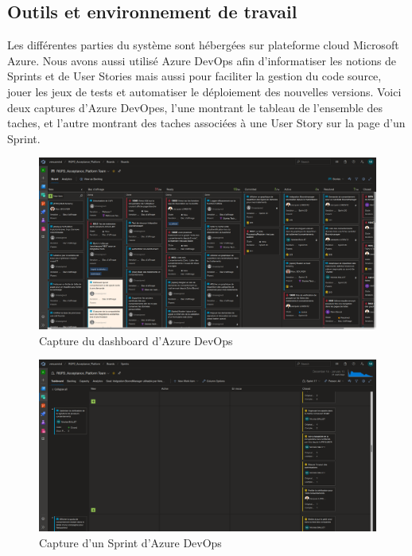 \documentclass[12pt, a4paper]{report}
\newcommand\tab[1][1cm]{\hspace*{#1}}
\begin{document}
\subsection{Outils et environnement de travail}
\tab{}Les différentes parties du système sont hébergées sur plateforme cloud Microsoft Azure.\newline
Nous avons aussi utilisé Azure DevOps afin d'informatiser les notions de Sprints et de User Stories mais aussi pour faciliter la gestion du code source, jouer les jeux de tests et automatiser le déploiement des nouvelles versions.\newline
Voici deux captures d'Azure DevOpes, l'une montrant le tableau de l'ensemble des taches, et l'autre montrant des taches associées à une User Story sur la page d'un Sprint.
\begin{figure}[H]
    \centering
    \includegraphics[width=\textwidth]{dashboard_azure.png}
    \caption{Capture du dashboard d'Azure DevOps}
\end{figure}
\begin{figure}[H]
    \centering
    \includegraphics[width=\textwidth]{sprint_azure.png}
    \caption{Capture d'un Sprint d'Azure DevOps}
\end{figure}
\end{document}
